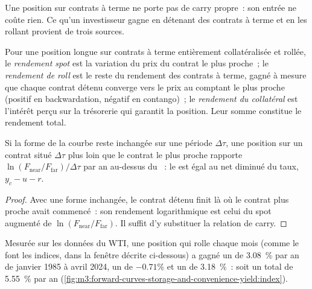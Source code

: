 Une position sur contrats à terme ne porte pas de carry propre~: son entrée ne coûte rien. Ce qu'un investisseur gagne en
détenant des contrats à terme et en les rollant provient de trois sources.

\begin{definition}\label{def:m3:forward-curves-storage-and-convenience-yield:roll}
Pour une position longue sur contrats à terme entièrement collatéralisée et rollée, le \emph{rendement spot}
est la variation du prix du contrat le plus proche~; le \emph{rendement de roll} est le reste du
rendement des contrats à terme, gagné à mesure que chaque contrat détenu converge vers le prix au comptant le plus proche
(positif en backwardation, négatif en contango)~; le \emph{rendement du collatéral} est
l'intérêt perçu sur la trésorerie qui garantit la position. Leur somme constitue le rendement total.
\end{definition}

\begin{proposition}\label{prop:m3:forward-curves-storage-and-convenience-yield:rolly}
Si la forme de la courbe reste inchangée sur une période $\Delta\tau$, une position sur un contrat situé $\Delta\tau$
plus loin que le contrat le plus proche rapporte $\ln(F_{\mathrm{near}}/F_{\mathrm{far}})/\Delta\tau$ par an au-dessus du
~: le  est égal au  net diminué du taux,
$y_c - u - r$.
\end{proposition}

\begin{proof}
Avec une forme inchangée, le contrat détenu finit là où le contrat plus proche avait commencé~: son rendement logarithmique
est celui du spot augmenté de $\ln(F_{\mathrm{near}}/F_{\mathrm{far}})$. Il suffit d'y substituer la relation de carry.
\end{proof}

Mesurée sur les données du WTI, une position qui rolle chaque mois (comme le font les indices, dans la fenêtre décrite
ci-dessous) a gagné un  de 3.08~\% par an de janvier 1985 à avril 2024, un  de $-0.71\%$
et un  de 3.18~\%~: soit un total de 5.55~\% par an
(\cref{fig:m3:forward-curves-storage-and-convenience-yield:index}).

